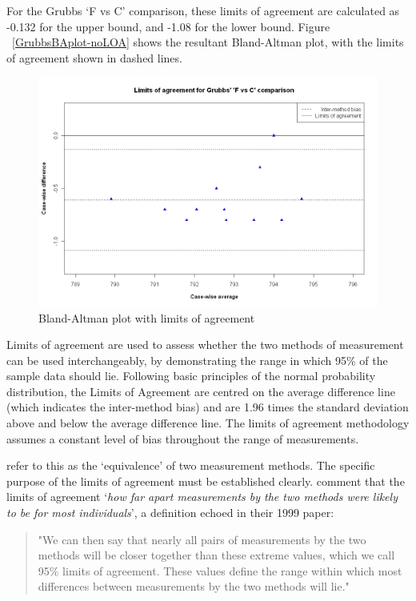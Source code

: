 \documentclass[12pt, a4paper]{report}
\theoremstyle{plain}
\theoremstyle{definition}
\theoremstyle{remark}
\begin{document}
For the Grubbs `F vs C' comparison, these limits
of agreement are calculated as -0.132 for the upper bound, and
-1.08 for the lower bound. Figure ~\ref{GrubbsBAplot-noLOA} shows the resultant
Bland-Altman plot, with the limits of agreement shown in dashed
lines.


\begin{figure}[h!]
	\begin{center}
		\includegraphics[width=125mm]{images/GrubbsBAplot-LOA.jpeg}
		\caption{Bland-Altman plot with limits of agreement}
	\end{center}
\end{figure}

Limits of agreement are used to assess whether the two methods of
measurement can be used interchangeably, by demonstrating the range in which 95\% of the sample data should lie. Following basic principles of the normal probability distribution, the Limits of Agreement are centred on the average difference line (which indicates the inter-method bias) and are 1.96 times the standard deviation
above and below the average difference line. The limits of agreement methodology assumes a constant level of bias throughout the range of measurements. 

\citet{BA86} refer to
this as the `equivalence' of two measurement methods. The specific purpose of the limits of
agreement must be
established clearly. \citet*{BA95} comment that the limits of agreement `\textit{how
	far apart measurements by the two methods were likely to be for
	most individuals}', a definition echoed in their 1999 paper:

\begin{quote}"We can then say that nearly all pairs
	of measurements by the two methods will be closer together than
	these extreme values, which we call 95\% limits of agreement.
	These values define the range within which most differences
	between measurements by the two methods will lie."
\end{quote}
\end{document}
